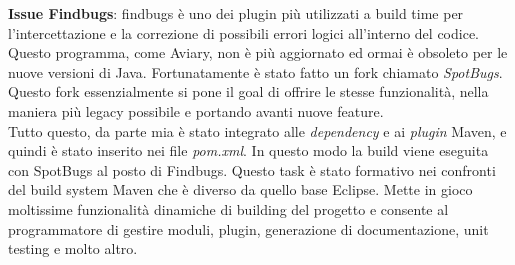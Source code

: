 \documentclass[a4paper]{article}
\begin{document}
\par \textbf{Issue Findbugs}: findbugs è uno dei plugin più utilizzati a build time 
per l'intercettazione e la correzione di possibili errori logici all'interno del codice.
Questo programma, come Aviary, non è più aggiornato ed ormai è obsoleto per le nuove
versioni di Java. Fortunatamente è stato fatto un fork chiamato \emph{SpotBugs}.
Questo fork essenzialmente si pone il goal di offrire le stesse funzionalità, nella
maniera più legacy possibile e portando avanti nuove feature.\\
Tutto questo, da parte mia è stato integrato alle \emph{dependency} e ai \emph{plugin}
Maven, e quindi è stato inserito nei file \emph{pom.xml}. In questo modo la build viene
eseguita con SpotBugs al posto di Findbugs. Questo task è stato formativo nei confronti
del build system Maven che è diverso da quello base Eclipse. Mette in gioco moltissime
funzionalità dinamiche di building del progetto e consente al programmatore di gestire
moduli, plugin, generazione di documentazione, unit testing e molto altro.
\\
\end{document}
